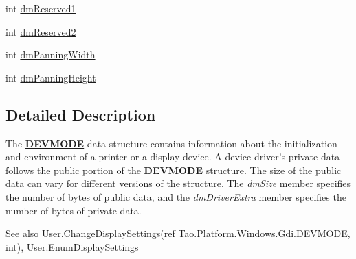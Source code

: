 \begin{DoxyCompactItemize}
\item 
int \hyperlink{struct_tao_1_1_platform_1_1_windows_1_1_gdi_1_1_d_e_v_m_o_d_e_abfc655d71737e470a320855ee3c0cb73}{dmReserved1}
\item 
int \hyperlink{struct_tao_1_1_platform_1_1_windows_1_1_gdi_1_1_d_e_v_m_o_d_e_ad2fcc12ff21a6ba4d2b711a2aee88026}{dmReserved2}
\item 
int \hyperlink{struct_tao_1_1_platform_1_1_windows_1_1_gdi_1_1_d_e_v_m_o_d_e_a247eec18a1c81a553daf778fa9fd3035}{dmPanningWidth}
\item 
int \hyperlink{struct_tao_1_1_platform_1_1_windows_1_1_gdi_1_1_d_e_v_m_o_d_e_a8508fdb2c7ebea0233a8df4bc4ff6f29}{dmPanningHeight}
\end{DoxyCompactItemize}


\subsection{Detailed Description}
The {\bfseries \hyperlink{struct_tao_1_1_platform_1_1_windows_1_1_gdi_1_1_d_e_v_m_o_d_e}{DEVMODE}} data structure contains information about the initialization and environment of a printer or a display device. A device driver's private data follows the public portion of the {\bfseries \hyperlink{struct_tao_1_1_platform_1_1_windows_1_1_gdi_1_1_d_e_v_m_o_d_e}{DEVMODE}} structure. The size of the public data can vary for different versions of the structure. The {\itshape dmSize\/} member specifies the number of bytes of public data, and the {\itshape dmDriverExtra\/} member specifies the number of bytes of private data. 

\begin{DoxySeeAlso}{See also}
User.ChangeDisplaySettings(ref Tao.Platform.Windows.Gdi.DEVMODE, int), User.EnumDisplaySettings


\end{DoxySeeAlso}


